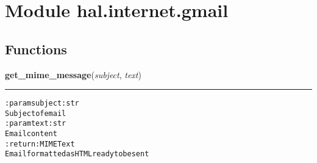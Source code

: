 %
%
%


\section{Module hal.internet.gmail}

    \label{hal:internet:gmail}


  \subsection{Functions}

    \label{hal:internet:gmail:get_mime_message}

    \vspace{0.5ex}

\hspace{.8\funcindent}\begin{boxedminipage}{\funcwidth}

    \raggedright \textbf{get\_mime\_message}(\textit{subject}, \textit{text})

    \vspace{-1.5ex}

    \rule{\textwidth}{0.5\fboxrule}
\setlength{\parskip}{2ex}
\begin{alltt}

:param subject: str
    Subject of email
:param text: str
    Email content
:return: MIMEText
    Email formatted as HTML ready to be sent
\end{alltt}

\setlength{\parskip}{1ex}
    \end{boxedminipage}

